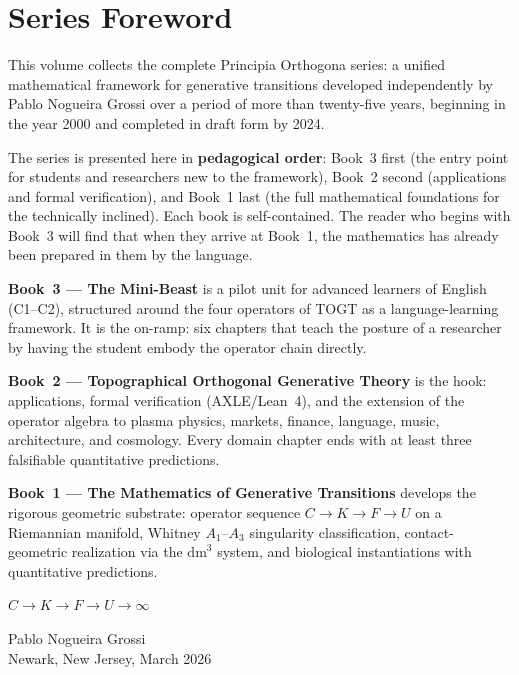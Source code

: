 \documentclass[11pt, twoside, openright]{book}
\theoremstyle{plain}
\theoremstyle{definition}
\newcommand{\dm}{\mathrm{dm}^3}
\begin{document}
\chapter*{Series Foreword}

This volume collects the complete Principia Orthogona
series: a unified mathematical framework for generative
transitions developed independently by Pablo Nogueira
Grossi over a period of more than twenty-five years,
beginning in the year 2000 and completed in draft form by
2024.

The series is presented here in \textbf{pedagogical order}:
Book~3 first (the entry point for students and researchers
new to the framework), Book~2 second (applications and
formal verification), and Book~1 last (the full mathematical
foundations for the technically inclined). Each book is
self-contained. The reader who begins with Book~3 will
find that when they arrive at Book~1, the mathematics has
already been prepared in them by the language.

\medskip
\noindent\textbf{Book~3 --- The Mini-Beast} is a pilot
unit for advanced learners of English (C1--C2), structured
around the four operators of TOGT as a language-learning
framework. It is the on-ramp: six chapters that teach
the posture of a researcher by having the student embody
the operator chain directly.

\medskip
\noindent\textbf{Book~2 --- Topographical Orthogonal
Generative Theory} is the hook: applications, formal
verification (AXLE/Lean~4), and the extension of the
operator algebra to plasma physics, markets, finance,
language, music, architecture, and cosmology. Every
domain chapter ends with at least three falsifiable
quantitative predictions.

\medskip
\noindent\textbf{Book~1 --- The Mathematics of Generative
Transitions} develops the rigorous geometric substrate:
operator sequence $C \to K \to F \to U$ on a Riemannian
manifold, Whitney $A_1$--$A_3$ singularity classification,
contact-geometric realization via the $\dm$ system, and
biological instantiations with quantitative predictions.

\bigskip
\noindent $C \longrightarrow K \longrightarrow F \longrightarrow U \longrightarrow \infty$

\bigskip
\begin{flushright}
Pablo Nogueira Grossi\\
Newark, New Jersey, March 2026
\end{flushright}
\end{document}

